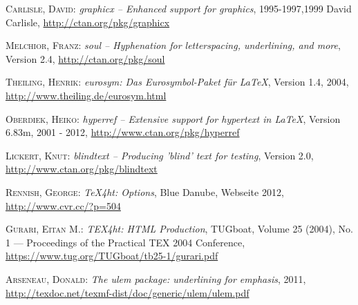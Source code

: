 \begin{flushleft}
\begin{thebibliography}{999}
\textsc{Carlisle, David}:
\emph{graphicx – Enhanced support for graphics},
1995-1997,1999 David Carlisle,
\url{http://ctan.org/pkg/graphicx}


\textsc{Melchior, Franz}:
\emph{soul – Hyphenation for letterspacing, underlining, and more},
Version 2.4,
\url{http://ctan.org/pkg/soul}

\textsc{Theiling, Henrik}:
\emph{eurosym: Das Eurosymbol-Paket für LaTeX},
Version 1.4, 2004,
\url{http://www.theiling.de/eurosym.html}


\textsc{Oberdiek, Heiko}:
\emph{hyperref – Extensive support for hypertext in LaTeX},
Version 6.83m, 2001 - 2012,
\url{http://www.ctan.org/pkg/hyperref}

\textsc{Lickert, Knut}:
\emph{blindtext – Producing 'blind' text for testing},
Version 2.0,
\url{http://www.ctan.org/pkg/blindtext}

\textsc{Rennish, George}:
\emph{TeX4ht: Options},
Blue Danube, Webseite 2012,
\url{http://www.cvr.cc/?p=504}

\textsc{Gurari, Eitan M.}:
\emph{TEX4ht: HTML Production},
TUGboat, Volume 25 (2004), No. 1 — Proceedings of the Practical TEX 2004 Conference,
\url{https://www.tug.org/TUGboat/tb25-1/gurari.pdf}


\textsc{Arseneau, Donald}:
\emph{The ulem package: underlining for emphasis},
2011,
\url{http://texdoc.net/texmf-dist/doc/generic/ulem/ulem.pdf}



\end{thebibliography}
\end{flushleft}

